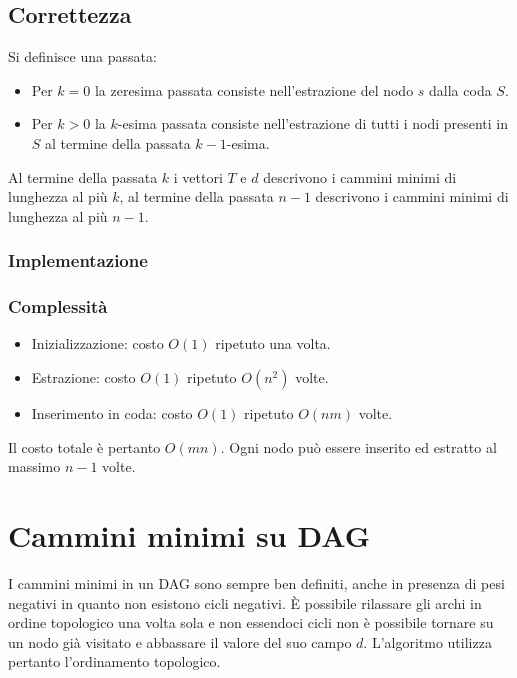 \subsection{Correttezza}
Si definisce una passata:
\begin{itemize}
	\item Per $k=0$ la zeresima passata consiste nell'estrazione del nodo $s$ dalla coda $S$.
	\item Per $k>0$ la $k$-esima passata consiste nell'estrazione di tutti i nodi presenti in $S$ al termine della passata $k-1$-esima.
\end{itemize}
Al termine della passata $k$ i vettori $T$ e $d$ descrivono i cammini minimi di lunghezza al pi\`u $k$, al termine della passata $n-1$ descrivono i cammini minimi di lunghezza al pi\`u
$n-1$. 
\subsubsection{Implementazione}

\subsubsection{Complessit\`a}
\begin{itemize}
	\item Inizializzazione: costo $O(1)$ ripetuto una volta.
	\item Estrazione: costo $O(1)$ ripetuto $O(n^2)$ volte.
	\item Inserimento in coda: costo $O(1)$ ripetuto $O(nm)$ volte.
\end{itemize}
Il costo totale \`e pertanto $O(mn)$. Ogni nodo pu\`o essere inserito ed estratto al massimo $n-1$ volte.
\section{Cammini minimi su DAG}
I cammini minimi in un DAG sono sempre ben definiti, anche in presenza di pesi negativi in quanto non esistono cicli negativi. \`E possibile rilassare gli archi in ordine topologico una
volta sola e non essendoci cicli non \`e possibile tornare su un nodo gi\`a visitato e abbassare il valore del suo campo $d$. L'algoritmo utilizza pertanto l'ordinamento topologico.\\


